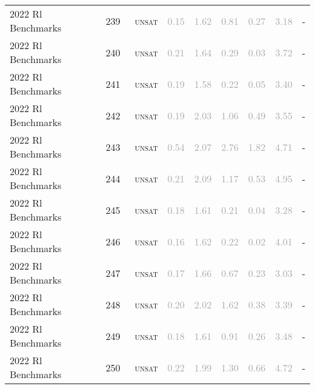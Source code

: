\begin{center}
{\begin{longtable}{@{}lllllllll@{}}
2022 Rl Benchmarks & 239 & ~\textsc{unsat} & \textcolor{darkgray}{0.15} & \textcolor{darkgray}{1.62} & \textcolor{darkgray}{0.81} & \textcolor{darkgray}{0.27} & \textcolor{darkgray}{3.18} & - \\
2022 Rl Benchmarks & 240 & ~\textsc{unsat} & \textcolor{darkgray}{0.21} & \textcolor{darkgray}{1.64} & \textcolor{darkgray}{0.29} & \textcolor{darkgray}{0.03} & \textcolor{darkgray}{3.72} & - \\
2022 Rl Benchmarks & 241 & ~\textsc{unsat} & \textcolor{darkgray}{0.19} & \textcolor{darkgray}{1.58} & \textcolor{darkgray}{0.22} & \textcolor{darkgray}{0.05} & \textcolor{darkgray}{3.40} & - \\
2022 Rl Benchmarks & 242 & ~\textsc{unsat} & \textcolor{darkgray}{0.19} & \textcolor{darkgray}{2.03} & \textcolor{darkgray}{1.06} & \textcolor{darkgray}{0.49} & \textcolor{darkgray}{3.55} & - \\
2022 Rl Benchmarks & 243 & ~\textsc{unsat} & \textcolor{darkgray}{0.54} & \textcolor{darkgray}{2.07} & \textcolor{darkgray}{2.76} & \textcolor{darkgray}{1.82} & \textcolor{darkgray}{4.71} & - \\
2022 Rl Benchmarks & 244 & ~\textsc{unsat} & \textcolor{darkgray}{0.21} & \textcolor{darkgray}{2.09} & \textcolor{darkgray}{1.17} & \textcolor{darkgray}{0.53} & \textcolor{darkgray}{4.95} & - \\
2022 Rl Benchmarks & 245 & ~\textsc{unsat} & \textcolor{darkgray}{0.18} & \textcolor{darkgray}{1.61} & \textcolor{darkgray}{0.21} & \textcolor{darkgray}{0.04} & \textcolor{darkgray}{3.28} & - \\
2022 Rl Benchmarks & 246 & ~\textsc{unsat} & \textcolor{darkgray}{0.16} & \textcolor{darkgray}{1.62} & \textcolor{darkgray}{0.22} & \textcolor{darkgray}{0.02} & \textcolor{darkgray}{4.01} & - \\
2022 Rl Benchmarks & 247 & ~\textsc{unsat} & \textcolor{darkgray}{0.17} & \textcolor{darkgray}{1.66} & \textcolor{darkgray}{0.67} & \textcolor{darkgray}{0.23} & \textcolor{darkgray}{3.03} & - \\
2022 Rl Benchmarks & 248 & ~\textsc{unsat} & \textcolor{darkgray}{0.20} & \textcolor{darkgray}{2.02} & \textcolor{darkgray}{1.62} & \textcolor{darkgray}{0.38} & \textcolor{darkgray}{3.39} & - \\
2022 Rl Benchmarks & 249 & ~\textsc{unsat} & \textcolor{darkgray}{0.18} & \textcolor{darkgray}{1.61} & \textcolor{darkgray}{0.91} & \textcolor{darkgray}{0.26} & \textcolor{darkgray}{3.48} & - \\
2022 Rl Benchmarks & 250 & ~\textsc{unsat} & \textcolor{darkgray}{0.22} & \textcolor{darkgray}{1.99} & \textcolor{darkgray}{1.30} & \textcolor{darkgray}{0.66} & \textcolor{darkgray}{4.72} & - \\

\end{longtable}}
\end{center}
